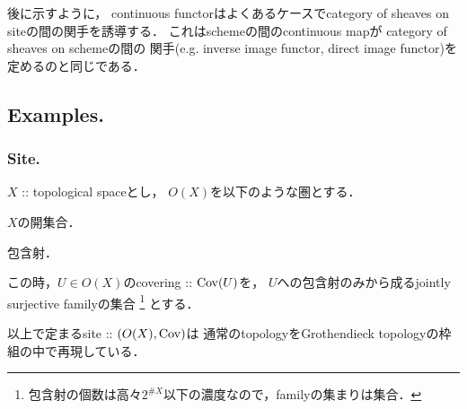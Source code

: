 \documentclass[a4paper, dvipdfmx]{jsarticle}
\begin{document}
\begin{Remark}
    後に示すように，
    continuous functorはよくあるケースでcategory of sheaves on siteの間の関手を誘導する．
    これはschemeの間のcontinuous mapが
    category of sheaves on schemeの間の
    関手(e.g. inverse image functor, direct image functor)を定めるのと同じである．
\end{Remark}

\subsection{Examples.}

\subsubsection{Site.}
\begin{Example}
    $X$ :: topological spaceとし，
    $O(X)$を以下のような圏とする．
    \begin{description}[labelindent=5mm]
        \item[対象] $X$の開集合．
        \item[射] 包含射．
    \end{description}
    この時，$U \in O(X)$のcovering :: $\operatorname{Cov}(U)$を，
    $U$への包含射のみから成るjointly surjective familyの集合
    \footnote{ 包含射の個数は高々$2^{\#X}$以下の濃度なので，familyの集まりは集合． }
    とする．

    以上で定まるsite :: $(O(X), \operatorname{Cov})$は
    通常のtopologyをGrothendieck topologyの枠組の中で再現している．
\end{Example}
\end{document}
